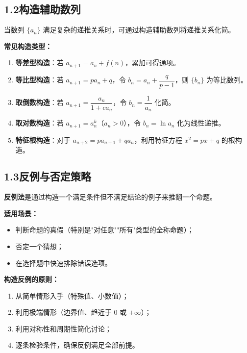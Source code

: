 \documentclass[12pt, a4paper]{ctexart}
\begin{document}
\subsection*{1.2\quad 构造辅助数列}

\begin{knowledgebox}[递推数列的构造]
当数列 $\{a_n\}$ 满足复杂的递推关系时，可通过构造辅助数列将递推关系化简。

\medskip
\textbf{常见构造类型：}
\begin{enumerate}[label=(\arabic*)]
  \item \textbf{等差型构造}：若 $a_{n+1} = a_n + f(n)$，累加可得通项。
  \item \textbf{等比型构造}：若 $a_{n+1} = pa_n + q$，令 $b_n = a_n + \dfrac{q}{p-1}$，则 $\{b_n\}$ 为等比数列。
  \item \textbf{取倒数构造}：若 $a_{n+1} = \dfrac{a_n}{1 + ca_n}$，令 $b_n = \dfrac{1}{a_n}$ 化简。
  \item \textbf{取对数构造}：若 $a_{n+1} = a_n^k$（$a_n > 0$），令 $b_n = \ln a_n$ 化为线性递推。
  \item \textbf{特征根构造}：对于 $a_{n+2} = pa_{n+1} + qa_n$，利用特征方程 $x^2 = px + q$ 的根构造。
\end{enumerate}
\end{knowledgebox}

\subsection*{1.3\quad 反例与否定策略}

\begin{knowledgebox}[反例法]
\textbf{反例法}是通过构造一个满足条件但不满足结论的例子来推翻一个命题。

\medskip
\textbf{适用场景：}
\begin{itemize}[label=$\bullet$]
  \item 判断命题的真假（特别是"对任意""所有"类型的全称命题）；
  \item 否定一个猜想；
  \item 在选择题中快速排除错误选项。
\end{itemize}

\medskip
\textbf{构造反例的原则：}
\begin{enumerate}[label=(\arabic*)]
  \item 从简单情形入手（特殊值、小数值）；
  \item 利用极端情形（边界值、趋近于 $0$ 或 $+\infty$）；
  \item 利用对称性和周期性简化讨论；
  \item 逐条检验条件，确保反例满足全部前提。
\end{enumerate}
\end{knowledgebox}
\end{document}
